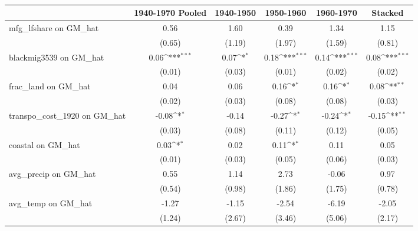 \begin{table}[htbp]\centering
\def\sym#1{\ifmmode^{#1}\else\(^{#1}\)\fi}
\caption{}
\begin{tabular}{l*{5}{c}}
\toprule
                &\multicolumn{1}{c}{1940-1970 Pooled}&\multicolumn{1}{c}{1940-1950}&\multicolumn{1}{c}{1950-1960}&\multicolumn{1}{c}{1960-1970}&\multicolumn{1}{c}{Stacked}\\
\midrule
mfg\_lfshare on GM\_hat&     0.56         &     1.60         &     0.39         &     1.34         &     1.15         \\
                &   (0.65)         &   (1.19)         &   (1.97)         &   (1.59)         &   (0.81)         \\
\addlinespace
blackmig3539 on GM\_hat&     0.06\sym{***}&     0.07\sym{*}  &     0.18\sym{***}&     0.14\sym{***}&     0.08\sym{***}\\
                &   (0.01)         &   (0.03)         &   (0.01)         &   (0.02)         &   (0.02)         \\
\addlinespace
frac\_land on GM\_hat&     0.04         &     0.06         &     0.16\sym{*}  &     0.16\sym{*}  &     0.08\sym{**} \\
                &   (0.02)         &   (0.03)         &   (0.08)         &   (0.08)         &   (0.03)         \\
\addlinespace
transpo\_cost\_1920 on GM\_hat&    -0.08\sym{*}  &    -0.14         &    -0.27\sym{*}  &    -0.24\sym{*}  &    -0.15\sym{**} \\
                &   (0.03)         &   (0.08)         &   (0.11)         &   (0.12)         &   (0.05)         \\
\addlinespace
coastal on GM\_hat&     0.03\sym{*}  &     0.02         &     0.11\sym{*}  &     0.11         &     0.05         \\
                &   (0.01)         &   (0.03)         &   (0.05)         &   (0.06)         &   (0.03)         \\
\addlinespace
avg\_precip on GM\_hat&     0.55         &     1.14         &     2.73         &    -0.06         &     0.97         \\
                &   (0.54)         &   (0.98)         &   (1.86)         &   (1.75)         &   (0.78)         \\
\addlinespace
avg\_temp on GM\_hat&    -1.27         &    -1.15         &    -2.54         &    -6.19         &    -2.05         \\
                &   (1.24)         &   (2.67)         &   (3.46)         &   (5.06)         &   (2.17)         \\

\end{tabular}
\end{table}
